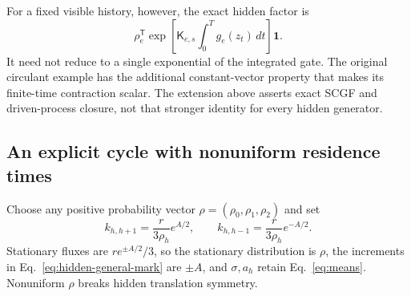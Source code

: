 \documentclass[aps,pre,reprint,amsmath,amssymb,longbibliography,floatfix]{revtex4-2}
\begin{document}
For a fixed visible history, however, the exact hidden factor is
\begin{equation}
 \rho_e^{\mathsf T}
 \exp\!\left[\mathsf K_{e,s}\int_0^T g_e(z_t)\,dt\right]\mathbf1.
 \label{eq:hidden-general-finite-time}
\end{equation}
It need not reduce to a single exponential of the integrated gate.
The original circulant example has the additional constant-vector
property that makes its finite-time contraction scalar. The extension
above asserts exact SCGF and driven-process closure, not that stronger
identity for every hidden generator.

\subsection{An explicit cycle with nonuniform residence times}
\label{app:hidden-noncirculant}

Choose any positive probability vector
$\rho=(\rho_0,\rho_1,\rho_2)$ and set
\begin{equation}
 k_{h,h+1}=\frac{r}{3\rho_h}e^{A/2},\qquad
 k_{h,h-1}=\frac{r}{3\rho_h}e^{-A/2}.
 \label{eq:hidden-residence-rates}
\end{equation}
Stationary fluxes are $re^{\pm A/2}/3$, so the stationary distribution
is $\rho$, the increments in Eq.~\eqref{eq:hidden-general-mark} are
$\pm A$, and $\sigma,a_h$ retain Eq.~\eqref{eq:means}.
Nonuniform $\rho$ breaks hidden translation symmetry.
\end{document}
